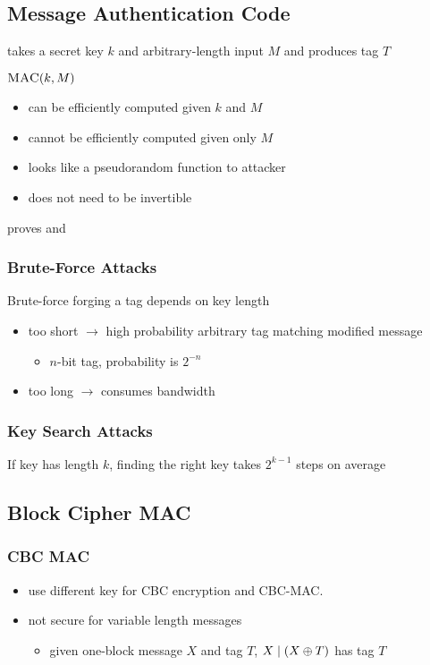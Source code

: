 \documentclass[final]{article}
\begin{document}
\subsection{Message Authentication Code}
takes a secret key $k$ and arbitrary-length input $M$ and produces tag $T$

$\textproc{MAC}(k, M)$
\begin{itemize}[nosep]
    \item can be efficiently computed given $k$ and $M$
    \item cannot be efficiently computed given only $M$
    \item looks like a pseudorandom function to attacker
    \item does not need to be invertible
\end{itemize}
proves  and 
\subsubsection{Brute-Force Attacks}
Brute-force forging a tag depends on key length
\begin{itemize}[nosep]
    \item too short $\rightarrow$ high probability arbitrary tag matching modified message
          \begin{itemize}[nosep]\item $n$-bit tag, probability is $2^{-n}$\end{itemize}
    \item too long $\rightarrow$ consumes bandwidth
\end{itemize}
\subsubsection{Key Search Attacks}
If key has length $k$, finding the right key takes $2^{k-1}$ steps on average
\subsection{Block Cipher MAC}
\subsubsection*{CBC MAC}
\begin{itemize}[nosep]
    \item use different key for CBC encryption and CBC-MAC.
    \item not secure for variable length messages
          \begin{itemize}[nosep]\item given one-block message $X$ and tag $T$, $X \mid (X \oplus T)$ has tag $T$\end{itemize}
\end{itemize}
\end{document}
